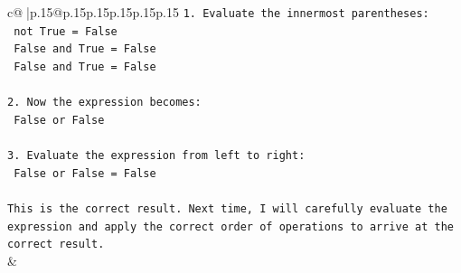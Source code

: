 \documentclass{article}
\begin{document}
{\begin{supertabular}{c@{$\;$}|p{.15\linewidth}@{}p{.15\linewidth}p{.15\linewidth}p{.15\linewidth}p{.15\linewidth}p{.15\linewidth}}
{{{\texttt{1. Evaluate the innermost parentheses: } \\
\texttt{   not True = False} \\
\texttt{   False and True = False} \\
\texttt{   False and True = False} \\
\\ 
\texttt{2. Now the expression becomes: } \\
\texttt{   False or False} \\
\\ 
\texttt{3. Evaluate the expression from left to right:} \\
\texttt{   False or False = False} \\
\\ 
\texttt{This is the correct result. Next time, I will carefully evaluate the expression and apply the correct order of operations to arrive at the correct result.} \\
            }
        }
    }
    & \\ \\

\end{supertabular}
}
\end{document}

